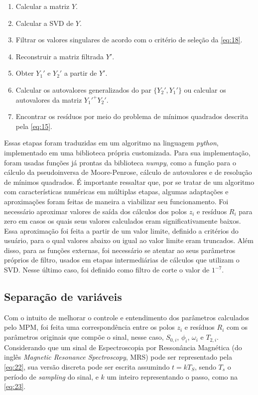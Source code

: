 \documentclass[12pt]{article}
\begin{document}
\begin{enumerate} \label{en:1}
    \item Calcular a matriz $Y$.
    \item Calcular a SVD de $Y$.
    \item Filtrar os valores singulares de acordo com o critério de seleção da \autoref{eq:18}.
    \item Reconstruir a matriz filtrada $Y'$.
    \item Obter $Y_1'$ e $Y_2'$ a partir de $Y'$.
    \item Calcular os autovalores generalizados do par $\{Y_2', Y_1'\}$ ou calcular os autovalores da matriz $Y_1'^+Y_2'$.
    \item Encontrar os resíduos por meio do problema de mínimos quadrados descrita pela \autoref{eq:15}.
\end{enumerate}

Essas etapas foram traduzidas em um algoritmo na linguagem \textit{python}, implementado em uma biblioteca própria customizada. Para sua implementação, 
foram usadas funções já prontas da biblioteca \textit{numpy}, como a função para o cálculo da pseudoinversa de Moore-Penrose, cálculo de autovalores e de resolução de 
mínimos quadrados. É importante ressaltar que, por se tratar de um algoritmo com características numéricas em múltiplas etapas, algumas adaptações e 
aproximações foram feitas de maneira a viabilizar seu funcionamento. Foi necessário aproximar valores de saída dos cálculos dos polos $z_i$ e resíduos 
$R_i$ para zero em casos os quais seus valores calculados eram significativamente baixos. Essa aproximação foi feita a partir de um valor limite, definido 
a critérios do usuário, para o qual valores abaixo ou igual ao valor limite eram truncados. Além disso, para as funções externas, foi necessário se atentar 
ao seus parâmetros próprios de filtro, usados em etapas intermediárias de cálculos que utilizam o SVD. Nesse último caso, foi definido como filtro de corte o 
valor de $1^{-7}$.

\subsection{Separação de variáveis}

Com o intuito de melhorar o controle e entendimento dos parâmetros calculados pelo MPM, foi feita uma correspondência entre os polos $z_i$ e resíduos $R_i$ com
os parâmetros originais que compõe o sinal, nesse caso, $S_{0, i}$, $\phi_i$, $\omega_i$ e $T_{2, i}$. Considerando que um sinal de Espectroscopia por Ressonância Magnética 
(do inglês \textit{Magnetic Resonance Spectroscopy}, MRS) pode ser representado pela \autoref{eq:22}, sua versão discreta pode ser escrita assumindo $t = kT_S$, sendo $T_s$ 
o período de \textit{sampling} do sinal, e $k$ um inteiro representando o passo, como na \autoref{eq:23}.
\end{document}
